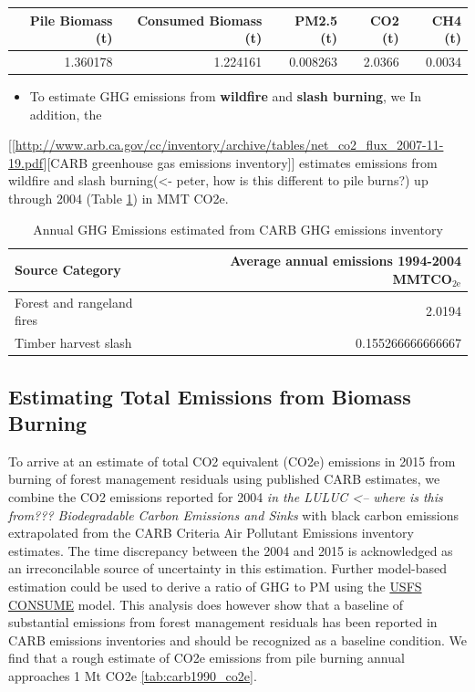 \documentclass[a4paper]{article}
\begin{document}
\begin{center}
\begin{tabular}{rrrrr}
Pile Biomass (t) & Consumed Biomass (t) & PM2.5 (t) & CO2 (t) & CH4 (t)\\
\hline
1.360178 & 1.224161 & 0.008263 & 2.0366 & 0.0034\\
\end{tabular}
\end{center}
\begin{itemize}
\item To estimate GHG emissions from \textbf{wildfire} and \textbf{slash burning}, we In addition, the
\end{itemize}
[[\url{http://www.arb.ca.gov/cc/inventory/archive/tables/net_co2_flux_2007-11-19.pdf}][CARB
greenhouse gas emissions inventory]] estimates emissions from
wildfire and slash burning(<- peter, how is this different to pile burns?) up through 2004 (Table \ref{arb_ghg_2004}) in MMT CO2e.
\begin{table}[htb]
\caption{Annual GHG Emissions estimated from CARB GHG emissions inventory \label{arb_ghg_2004}}
\centering
\begin{tabular}{lr}
Source Category & Average annual emissions 1994-2004 MMTCO$_{\text{2e}}$\\
\hline
Forest and rangeland fires & 2.0194\\
Timber harvest slash & 0.155266666666667\\
\end{tabular}
\end{table}

\subsection{Estimating Total Emissions from Biomass Burning}
\label{sec-2-3}
To arrive at an estimate of total CO2 equivalent (CO2e) emissions in 2015 from burning of forest
management residuals using published CARB
estimates, we combine the CO2 emissions reported for 2004 \emph{\emph{\emph{in the
LULUC <-- where is this from??? Biodegradable Carbon Emissions and Sinks}}} with black carbon
emissions extrapolated from the CARB Criteria Air Pollutant Emissions
inventory estimates. The time discrepancy between the 2004 and 2015 is
acknowledged as an irreconcilable source of uncertainty in this
estimation. Further model-based estimation could be used to derive a
ratio of GHG to PM using the \href{http://www.fs.fed.us/pnw/fera/research/smoke/consume/index.shtml}{USFS CONSUME} model. This analysis does however show that a baseline of
substantial emissions from forest management residuals has been reported
in CARB emissions inventories and should be recognized as a baseline
condition. We find that a rough estimate of CO2e emissions from pile
burning annual approaches 1 Mt CO2e \ref{tab:carb1990_co2e}.
\end{document}
